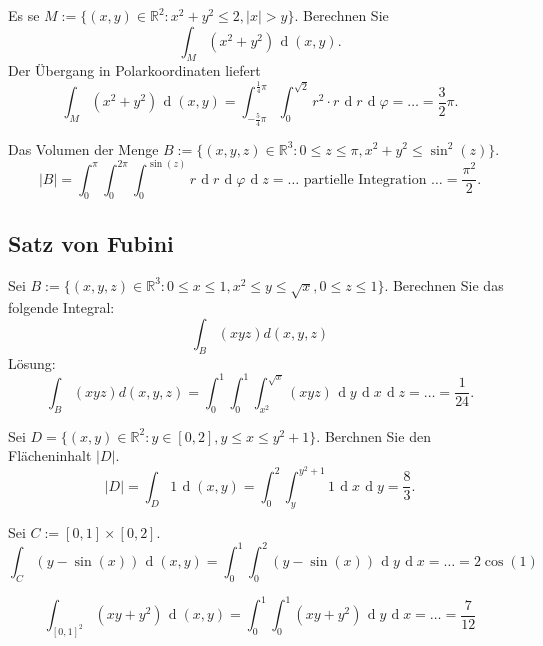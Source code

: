 \documentclass[parskip=full]{scrartcl}
\DeclareMathOperator{\diff}{\mathop{}\!\mathrm{d}}
\begin{document}
Es se $M := \{(x,y) \in \mathbb{R}^2 : x^2 + y^2 \leq 2, |x| > y\}$.
Berechnen Sie
\begin{displaymath}
  \int_M (x^2 + y^2) \diff (x,y).
\end{displaymath}
Der Übergang in Polarkoordinaten liefert
\begin{displaymath}
  \int_M (x^2 + y^2) \diff (x,y) = \int_{-\frac{5}{4}\pi}^{\frac{1}{4} \pi} \int_0^{\sqrt{2}} r^2 \cdot r \diff r \diff \varphi = \dots = \frac{3}{2} \pi.
\end{displaymath}

Das Volumen der Menge $B := \{(x,y,z) \in \mathbb{R}^3 : 0 \leq z \leq \pi, x^2 + y^2 \leq \sin^2(z)\}$.
\begin{displaymath}
  |B| = \int_0^{\pi} \int_0^{2\pi} \int_0^{\sin(z)} r \diff r \diff \varphi \diff z = \dots \text{ partielle Integration } \dots = \frac{\pi^2}{2}.
\end{displaymath}

\subsection{Satz von Fubini}
Sei $B := \{(x,y,z) \in \mathbb{R}^3 : 0 \leq x \leq 1, x^2 \leq y \leq \sqrt{x}, 0 \leq z \leq 1\}$.
Berechnen Sie das folgende Integral:
\begin{displaymath}
  \int_B (xyz) d(x,y,z)
\end{displaymath}
Lösung:
\begin{displaymath}
  \int_B (xyz) d(x,y,z) = \int_0^1 \int_0^1 \int_{x^2}^{\sqrt{x}} (xyz) \diff y \diff x \diff z = \dots = \frac{1}{24}.
\end{displaymath}

Sei $D = \{(x,y) \in \mathbb{R}^2 : y \in [0,2], y \leq x \leq y^2 + 1\}$.
Berchnen Sie den Flächeninhalt $|D|$.
\begin{displaymath}
  |D| = \int_D 1 \diff (x,y) = \int_0^2 \int_y^{y^2 + 1} 1 \diff x \diff y = \frac{8}{3}.
\end{displaymath}

Sei $C := [0,1] \times [0,2]$.
\begin{displaymath}
  \int_C (y - \sin(x)) \diff(x,y) = \int_0^1 \int_0^2 (y - \sin(x)) \diff y \diff x = \dots = 2 \cos(1)
\end{displaymath}

\begin{displaymath}
  \int_{[0,1]^2} (xy + y^2) \diff(x,y) = \int_0^1 \int_0^1 (xy + y^2) \diff y \diff x = \dots = \frac{7}{12}
\end{displaymath}
\end{document}
